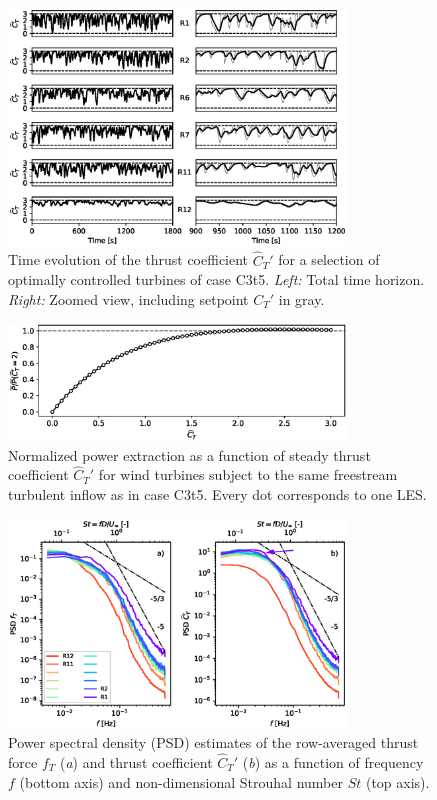 \documentclass[wes, manuscript]{copernicus}
\begin{document}
\begin{figure}
	\includegraphics[width=0.8\textwidth]{figure5}
	\caption{Time evolution of the thrust coefficient $\widehat{C}_{T}'$ for a selection of optimally controlled turbines  of case C3t5. \emph{Left: } Total time horizon. \emph{Right: } Zoomed view, including setpoint $C_T'$ in gray. \label{fig:controls}}
\end{figure}

\begin{figure}
	\includegraphics[width=0.8\textwidth]{figure6}
	\caption{Normalized power extraction as a function of steady thrust coefficient $\widehat{C}_{T}'$ for wind turbines subject to the same freestream turbulent inflow as in case C3t5. Every dot corresponds to one LES.\label{fig:ct_sweep}}
\end{figure}

\begin{figure}
	\includegraphics[width=0.8\textwidth]{figure7}
	\caption{Power spectral density (PSD) estimates of the row-averaged thrust force $f_T$ (\emph{a}) and thrust coefficient $\widehat{C}_{T}'$ (\emph{b}) as a function of frequency $f$ (bottom axis) and non-dimensional Strouhal number $St$ (top axis). \label{fig:spectra_thrust_cthat}}
\end{figure}
\end{document}

